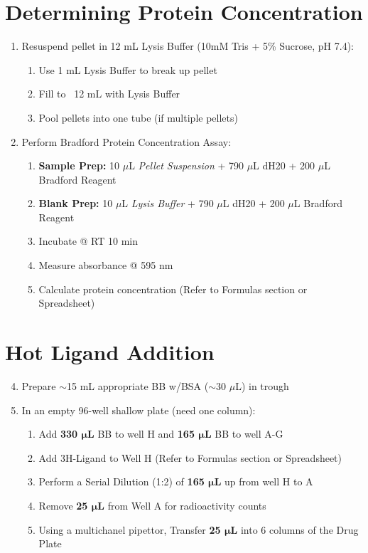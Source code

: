 \documentclass[12pt, letterpaper]{article}
\begin{document}
\section{Determining Protein Concentration}
\begin{enumerate}
    \item Resuspend pellet in 12 mL Lysis Buffer (10mM Tris + 5\% Sucrose, pH 7.4):
    \begin{enumerate}
        \item Use 1 mL Lysis Buffer to break up pellet
        \item Fill to ~12 mL with Lysis Buffer
        \item Pool pellets into one tube (if multiple pellets)
    \end{enumerate}

    \item Perform Bradford Protein Concentration Assay:
    \begin{enumerate}
        \item \textbf{Sample Prep:} 10 $\mu$L \emph{Pellet Suspension} + 790 $\mu$L dH20 + 200 $\mu$L Bradford Reagent
        \item \textbf{Blank Prep:} 10 $\mu$L \emph{Lysis Buffer} + 790 $\mu$L dH20 + 200 $\mu$L Bradford Reagent
        \item Incubate @ RT 10 min
        \item Measure absorbance @ 595 nm
        \item Calculate protein concentration (Refer to Formulas section or Spreadsheet)
    \end{enumerate}
\end{enumerate}

\section{Hot Ligand Addition}
\begin{enumerate}
    \setcounter{enumi}{3}
    \item Prepare $\sim$15 mL appropriate BB w/BSA ($\sim$30 $\mu$L) in trough
    \item In an empty 96-well shallow plate (need one column):
    \begin{enumerate}
        \item Add \textbf{330 $\bm{\mu}$L} BB to well H and \textbf{165 $\bm{\mu}$L} BB to well A-G
        \item Add 3H-Ligand to Well H (Refer to Formulas section or Spreadsheet)
        \item Perform a Serial Dilution (1:2) of \textbf{165 $\bm{\mu}$L} up from well H to A
        \item Remove \textbf{25 $\bm{\mu}$L} from Well A for radioactivity counts
        \item Using a multichanel pipettor, Transfer \textbf{25 $\bm{\mu}$L} into 6 columns of the Drug Plate
    \end{enumerate}
\end{enumerate}
\end{document}
